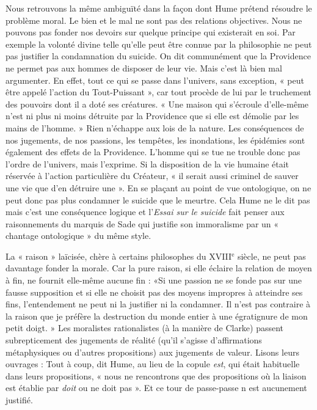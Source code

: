 Nous retrouvons la même ambiguïté dans la façon dont
Hume prétend résoudre le problème moral. Le bien et le
mal ne sont pas des relations objectives. Nous ne pouvons
pas fonder nos devoirs sur quelque principe qui existerait
en soi. Par exemple la volonté divine telle qu’elle peut
être connue par la philosophie ne peut pas justifier la
condamnation du suicide. On dit communément que la
Providence ne permet pas aux hommes de disposer de
leur vie. Mais c’est là bien mal argumenter. En effet, tout
ce qui se passe dans l’univers, sans exception, « peut être
appelé l’action du Tout-Puissant », car tout procède de
lui par le truchement des pouvoirs dont il a doté ses créatures. 
« Une maison qui s'écroule d’elle-même n’est ni
plus ni moins détruite par la Providence que si elle est
démolie par les mains de l’homme. » Rien n’échappe aux
lois de la nature. Les conséquences de nos jugements,
de nos passions, les tempêtes, les inondations, les épidémies 
sont également des effets de la Providence. L’homme
qui se tue ne trouble donc pas l’ordre de l'univers, mais
l’exprime. Si la disposition de la vie humaine était réservée
à l’action particulière du Créateur,  « il serait aussi criminel
de sauver une vie que d’en détruire une ». En se plaçant
au point de vue ontologique, on ne peut donc pas plus
condamner le suicide que le meurtre. Cela Hume ne le
dit pas mais c’est une conséquence logique et l’{\it Essai
sur le suicide} fait penser aux raisonnements du marquis
de Sade qui justifie son immoralisme par un « chantage ontologique » du même style.

La « raison » laïcisée, chère à certains philosophes du
{\footnotesize XVIII}$^\text{e}$ siècle, ne peut pas davantage fonder la morale.
Car la pure raison, si elle éclaire la relation de moyen à
fin, ne fournit elle-même aucune fin : «Si une passion ne
se fonde pas sur une fausse supposition et si elle ne choisit
pas des moyens impropres à atteindre ses fins, l’entendement 
ne peut ni la justifier ni la condamner. Il n’est
pas contraire à la raison que je préfère la destruction du
monde entier à une égratignure de mon petit doigt. »
Les moralistes rationalistes (à la manière de Clarke)
passent subrepticement des jugements de réalité (qu’il
s’agisse d’affirmations métaphysiques ou d’autres propositions) 
aux jugements de valeur. Lisons leurs ouvrages :
Tout à coup, dit Hume, au lieu de la copule {\it est}, qui était
habituelle dans leurs propositions, « nous ne rencontrons
que des propositions où la liaison est établie par {\it doit} ou
ne doit pas ». Et ce tour de passe-passe n est aucunement justifié.

